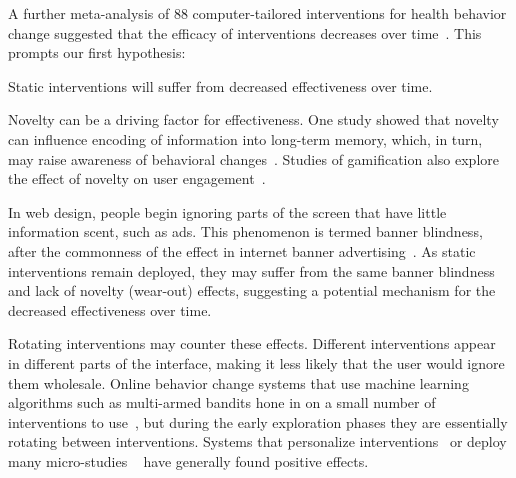 A further meta-analysis of 88 computer-tailored interventions for health behavior change suggested that the efficacy of interventions decreases over time~\cite{krebs2010meta}. This prompts our first hypothesis: %

\begin{hyp} \label{hyp:decreaseovertime}
Static interventions will suffer from decreased effectiveness over time.
\end{hyp}

Novelty can be a driving factor for effectiveness. %
One study showed that novelty can influence encoding of information into long-term memory, which, in turn, may raise awareness of behavioral changes~\cite{doi:10.1111/j.1467-9450.2005.00443.x}. Studies of gamification also explore the effect of novelty on user engagement~\cite{6758978}.  %

In web design, people begin ignoring parts of the screen that have little information scent, such as ads. This phenomenon is termed banner blindness, after the commonness of the effect in internet banner advertising~\cite{benway1998banner}. As static interventions remain deployed, they may suffer from the same banner blindness and lack of novelty (wear-out) effects, suggesting a potential mechanism for the decreased effectiveness over time.

Rotating interventions may counter these effects.
Different interventions appear in different parts of the interface, making it less likely that the user would ignore them wholesale.
Online behavior change systems that use machine learning algorithms such as multi-armed bandits hone in on a small number of interventions to use~\cite{paredes2014poptherapy, rabbi2014automated}, but during the early exploration phases they are essentially rotating between interventions. %
Systems that personalize interventions~\cite{kaptein2015personalizing} or deploy many micro-studies%
~\cite{doi:10.1111/j.1740-9713.2015.00863.x}
have generally found positive effects.

